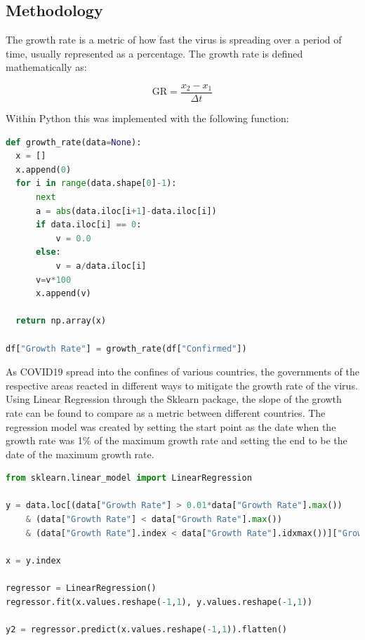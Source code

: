 \documentclass{homework}
\begin{document}
\subsection{Methodology}

The growth rate is a metric of how fast the virus is spreading over a period of time, usually represented as a percentage. The growth rate is defined mathematically as:

\begin{equation}
  \text{GR} = \frac{x_2 - x_1}{\Delta{t}}
\end{equation}

Within Python this was implemented with the following function:

\begin{lstlisting}[language=Python, caption={Growth Rate Function}, firstnumber=56]
def growth_rate(data=None):
  x = []
  x.append(0)
  for i in range(data.shape[0]-1):
      next
      a = abs(data.iloc[i+1]-data.iloc[i])
      if data.iloc[i] == 0:
          v = 0.0
      else:
          v = a/data.iloc[i]
      v=v*100
      x.append(v)
      
  return np.array(x)

df["Growth Rate"] = growth_rate(df["Confirmed"])
\end{lstlisting}

As COVID19 spread into the confines of various countries, the governments of the respective areas reacted in different ways to mitigate the growth rate of the virus. \\

Using Linear Regression through the Sklearn package, the slope of the growth rate can be found to compare as a metric between different countries. The regression model was created by setting the start point as the date when the growth rate was 1\% of the maximum growth rate and setting the end to be the date of the maximum growth rate.

\begin{lstlisting}[language=Python, caption={Growth Rate Linear Regression}, firstnumber=76]
from sklearn.linear_model import LinearRegression

y = data.loc[(data["Growth Rate"] > 0.01*data["Growth Rate"].max()) 
    & (data["Growth Rate"] < data["Growth Rate"].max()) 
    & (data["Growth Rate"].index < data["Growth Rate"].idxmax())]["Growth Rate"]

x = y.index

regressor = LinearRegression()  
regressor.fit(x.values.reshape(-1,1), y.values.reshape(-1,1))

y2 = regressor.predict(x.values.reshape(-1,1)).flatten()
\end{lstlisting}
\end{document}
